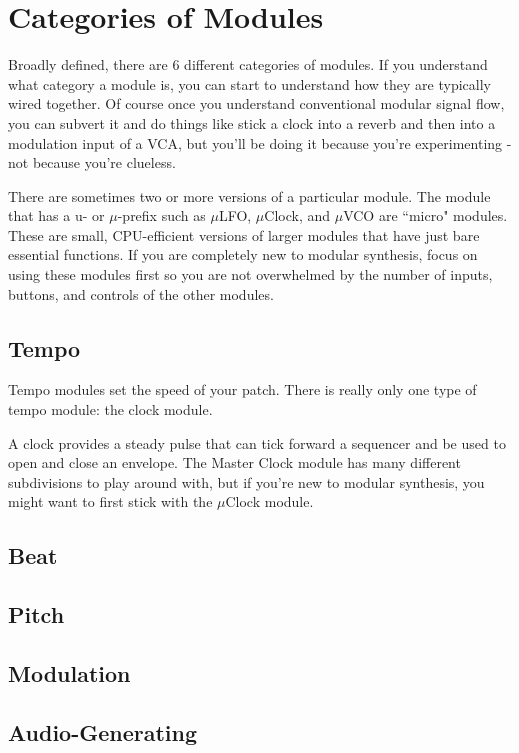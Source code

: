 \documentclass[11pt]{book}
\begin{document}
\section{Categories of Modules}

Broadly defined, there are 6 different categories of modules. If you understand what category a module is, you can start to understand how they are typically wired together. Of course once you understand conventional modular signal flow, you can subvert it and do things like stick a clock into a reverb and then into a modulation input of a VCA, but you'll be doing it because you're experimenting - not because you're clueless.

There are sometimes two or more versions of a particular module. The module that has a u- or $\mu$-prefix such as $\mu$LFO, $\mu$Clock, and $\mu$VCO are ``micro" modules. These are small, CPU-efficient versions of larger modules that have just bare essential functions. If you are completely new to modular synthesis, focus on using these modules first so you are not overwhelmed by the number of inputs, buttons, and controls of the other modules.

\subsection{Tempo}

Tempo modules set the speed of your patch. There is really only one type of tempo module: the clock module.

A clock provides a steady pulse that can tick forward a sequencer and be used to open and close an envelope. The Master Clock module has many different subdivisions to play around with, but if you're new to modular synthesis, you might want to first stick with the $\mu$Clock module.

\subsection{Beat}
\subsection{Pitch}
\subsection{Modulation}
\subsection{Audio-Generating}
\end{document}

